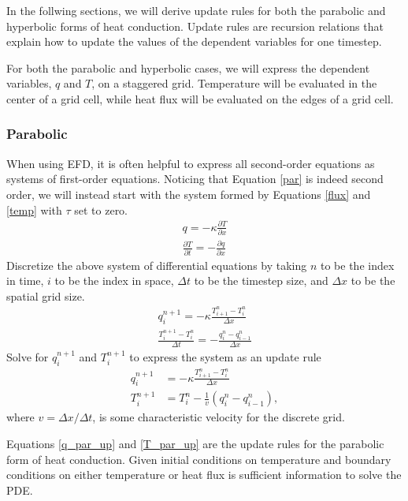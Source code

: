 \documentclass[iop]{emulateapj}
\begin{document}
				In the follwing sections, we will derive update rules for both the parabolic and hyperbolic forms of heat conduction.
					Update rules are recursion relations that explain how to update the values of the dependent variables for one timestep.
					
				For both the parabolic and hyperbolic cases, we will express the dependent variables, $q$ and $T$, on a staggered grid.
					Temperature will be evaluated in the center of a grid cell, while heat flux will be evaluated on the edges of a grid cell.
		
			\subsubsection{Parabolic}
			
				
			
				When using \ac{EFD}, it is often helpful to express all second-order equations as systems of first-order equations.
					Noticing that Equation \ref{par} is indeed second order, we will instead start with the system formed by Equations \ref{flux} and \ref{temp} with $\tau$ set to zero.
				\begin{gather}
					q = -\kappa \frac{\partial T}{\partial x} \\
					\frac{\partial T}{\partial t} = -\frac{\partial q}{\partial x} 
				\end{gather}
				Discretize the above system of differential equations by taking $n$ to be the index in time, $i$ to be the index in space, $\Delta t$ to be the timestep size, and $\Delta x$ to be the spatial grid size.
				\begin{gather}
					q_i^{n+1} = - \kappa \frac{T_{i+1}^n - T_i^n}{\Delta x} \\
					\frac{T_i^{n+1} - T_i^n}{\Delta t} = - \frac{q_i^n - q_{i-1}^n}{\Delta x}
				\end{gather}
				Solve for $q_i^{n+1}$ and $T_i^{n+1}$ to express the system as an update rule
				\begin{align}
						q_i^{n+1} &= - \kappa \frac{T_{i+1}^n - T_i^n}{\Delta x} \label{q_par_up}\\
						T_i^{n+1} &= T_i^n - \frac{1}{v} \left( q_i^n - q_{i-1}^n \right), \label{T_par_up}
				\end{align}
				where $v = \Delta x / \Delta t$, is some characteristic velocity for the discrete grid.
				
				Equations \ref{q_par_up} and \ref{T_par_up} are the update rules for the parabolic form of heat conduction. 
					Given initial conditions on temperature and boundary conditions on either temperature or heat flux is sufficient information to solve the \ac{PDE}.
					
\end{document}

